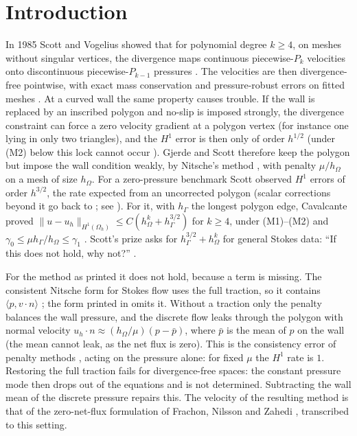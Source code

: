 \documentclass[5p,times]{elsarticle}
\theoremstyle{definition}
\newcommand{\hG}{h_\Gamma}
\newcommand{\hO}{h_\Omega}
\newcommand{\Oh}{\Omega_h}
\newcommand{\pbar}{\bar p}
\newcommand{\ip}[2]{\langle #1,#2\rangle}
\newcommand{\norm}[1]{\lVert #1\rVert}
\begin{document}
\section{Introduction}\label{sec:intro}

In 1985 Scott and Vogelius showed that for polynomial degree $k\ge4$, on meshes without singular vertices, the divergence maps continuous piecewise-$P_k$ velocities onto discontinuous piecewise-$P_{k-1}$ pressures \cite{ScottVogelius1985,GuzmanScott2019}. The velocities are then divergence-free pointwise, with exact mass conservation and pressure-robust errors on fitted meshes \cite{JohnEtAl2017}. At a curved wall the same property causes trouble. If the wall is replaced by an inscribed polygon and no-slip is imposed strongly, the divergence constraint can force a zero velocity gradient at a polygon vertex (for instance one lying in only two triangles), and the $H^1$ error is then only of order $h^{1/2}$ \cite{ScottPrize,GjerdeScott2024} (under (M2) below this lock cannot occur \cite{PadhiExt}). Gjerde and Scott \cite{GjerdeScott2024} therefore keep the polygon but impose the wall condition weakly, by Nitsche's method \cite{Nitsche1971}, with penalty $\mu/\hO$ on a mesh of size $\hO$. For a zero-pressure benchmark Scott observed $H^1$ errors of order $h^{3/2}$, the rate expected from an uncorrected polygon (scalar corrections beyond it go back to \cite{BrambleDupontThomee1972}; see \cite{DupontGuzmanScott2025}).
For it, with $\hG$ the longest polygon edge, Cavalcante proved $\norm{u-u_h}_{H^1(\Oh)}\le C(\hO^k+\hG^{3/2})$ for $k\ge4$, under (M1)--(M2) and $\gamma_0\le\mu\hG/\hO\le\gamma_1$ \cite[Thm.~5.2]{Cavalcante2026}.
 Scott's prize asks for $\hG^{3/2}+\hO^k$ for general Stokes data: ``If this does not hold, why not?'' \cite{ScottPrize}.

For the method as printed it does not hold, because a term is missing. The consistent Nitsche form for Stokes flow uses the full traction, so it contains $\ip{p}{v\cdot n}$ \cite{BurmanHansbo2014,BurmanHansboLarson2019Stokes}; the form printed in \cite[(27)--(28)]{GjerdeScott2024} omits it. Without a traction only the penalty balances the wall pressure, and the discrete flow leaks through the polygon with normal velocity $u_h\cdot n\approx(\hO/\mu)(p-\pbar)$, where $\pbar$ is the mean of $p$ on the wall (the mean cannot leak, as the net flux is zero). This is the consistency error of penalty methods \cite{Babuska1973}, acting on the pressure alone: for fixed $\mu$ the $H^1$ rate is $1$. Restoring the full traction fails for divergence-free spaces: the constant pressure mode then drops out of the equations and is not determined. Subtracting the wall mean of the discrete pressure repairs this. The velocity of the resulting method is that of the zero-net-flux formulation of Frachon, Nilsson and Zahedi \cite[\S5.1]{FrachonNilssonZahedi2024}, transcribed to this setting.
\end{document}

